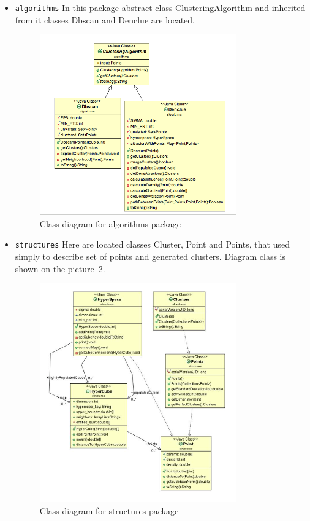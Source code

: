 \documentclass[12pt, a4paper, notitlepage, oneside]{article}
\begin{document}
\begin{itemize}
	\item \texttt{algorithms} In this package abstract class ClusteringAlgorithm and inherited from it classes Dbscan and Denclue are located. 

	\begin{figure}[!ht]
 	\centering
	\includegraphics[width=0.8\textwidth]{images/algorithms_package.png}
 	\caption[]
	{Class diagram for algorithms package}
\label{algorithms}
	\end{figure}


	\item \texttt{structures} Here are located classes Cluster, Point and Points, that used simply to describe set of points and generated clusters. Diagram class is shown on the picture~\ref{structures}.

	\begin{figure}[!ht]
 	\centering
	\includegraphics[width=0.8\textwidth]{images/structures_package.png}
 	\caption[]
	{Class diagram for structures package}
\label{structures}
	\end{figure}



\end{itemize}
\end{document}
